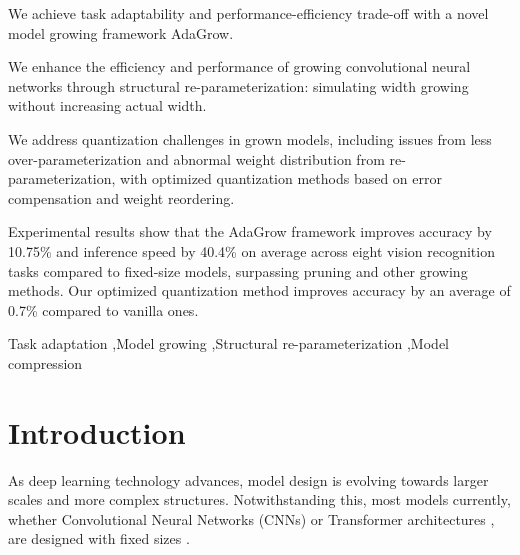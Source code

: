 \documentclass[preprint,12pt]{elsarticle}
\begin{document}
\begin{frontmatter}
\begin{highlights}
\item We achieve task adaptability and performance-efficiency trade-off with a novel model growing framework AdaGrow.
\item We enhance the efficiency and performance of growing convolutional neural networks through structural re-parameterization: simulating width growing without increasing actual width.
\item We address quantization challenges in grown models, including issues from less over-parameterization and abnormal weight distribution from re-parameterization, with optimized quantization methods based on error compensation and weight reordering.
\item Experimental results show that the AdaGrow framework improves accuracy by 10.75\% and inference speed by 40.4\% on average across eight vision recognition tasks compared to fixed-size models, surpassing pruning and other growing methods. Our optimized quantization method improves accuracy by an average of 0.7\% compared to vanilla ones.
\end{highlights}

\begin{keyword}
Task adaptation \sep Model growing \sep Structural re-parameterization \sep Model compression

\end{keyword}

\end{frontmatter}

\section{Introduction}
\label{introduction}
As deep learning technology advances, model design is evolving towards larger scales and more complex structures. Notwithstanding this, most models currently, whether Convolutional Neural Networks (CNNs) \cite{cnn} or Transformer architectures \cite{transformer}, are designed with fixed sizes \cite{fixscale}.
\end{document}
